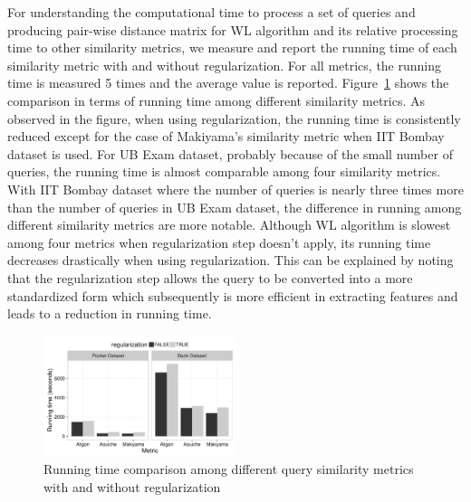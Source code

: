 For understanding the computational time to process a set of queries and producing pair-wise distance matrix for WL algorithm and its relative processing time to other similarity metrics, we measure and report the running time of each similarity metric with and without regularization. For all metrics, the running time is measured 5 times and the average value is reported. Figure~\ref{fig:running_time} shows the comparison in terms of running time among different similarity metrics. As observed in the figure, when using regularization, the running time is consistently reduced except for the case of Makiyama's similarity metric when IIT Bombay dataset is used. For UB Exam dataset, probably because of the small number of queries, the running time is almost comparable among four similarity metrics. With IIT Bombay dataset where the number of queries is nearly three times more than the number of queries in UB Exam dataset, the difference in running among different similarity metrics are more notable. Although WL algorithm is slowest among four metrics when regularization step doesn't apply, its running time decreases drastically when using regularization. This can be explained by noting that the regularization step allows the query to be converted into a more standardized form which subsequently is more efficient in extracting features and leads to a reduction in running time.

\begin{figure}[h!]
	\centering
    \includegraphics[width=0.5\textwidth]{graphics/running_time}
    \caption{Running time comparison among different query similarity metrics with and without regularization}
    \label{fig:running_time}
\end{figure}